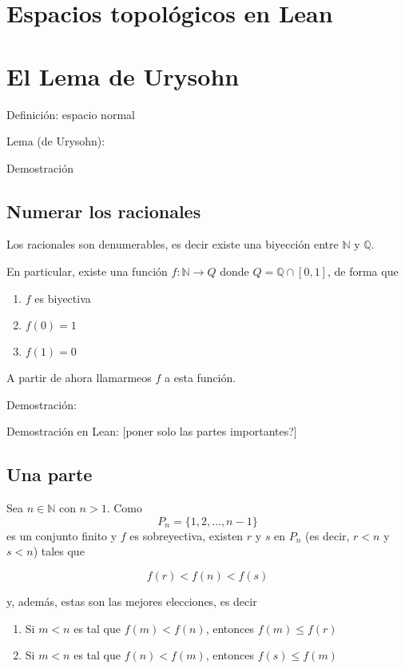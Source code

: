 \documentclass{article}
\newcommand{\nat}{\mathbb{N}}
\newcommand{\rat}{\mathbb{Q}}
\begin{document}
\section{Espacios topológicos en Lean}


\section{El Lema de Urysohn}

Definición: espacio normal

Lema (de Urysohn):

Demostración


\subsection{Numerar los racionales}

Los racionales son denumerables, es decir existe una biyección entre $\nat$ y $\rat$.

En particular, existe una función $f : \nat \to Q$ donde $Q = \rat \cap [0, 1]$, de forma que

\begin{enumerate}
  \item $f$ es biyectiva
  \item $f(0) = 1$
  \item $f(1) = 0$
\end{enumerate}

A partir de ahora llamarmeos $f$ a esta función.

Demostración:

Demostración en Lean: [poner solo las partes importantes?]

\subsection{Una parte}

Sea $n \in \nat$ con $n > 1$. Como $$P_n = \{1, 2, \dots, n-1\}$$ es un conjunto finito y $f$ es sobreyectiva, existen $r$ y $s$ en $P_n$ (es decir, $r < n$ y $s < n$) tales que

\begin{equation} \label{cond_rs}
  f(r) < f(n) < f(s)
\end{equation}

y, además, estas son las mejores elecciones, es decir

\begin{enumerate}
  \item Si $m < n$ es tal que $f(m) < f(n)$, entonces $f(m) \leq f(r)$
  \item Si $m < n$ es tal que $f(n) < f(m)$, entonces $f(s) \leq f(m)$
\end{enumerate}
\end{document}
